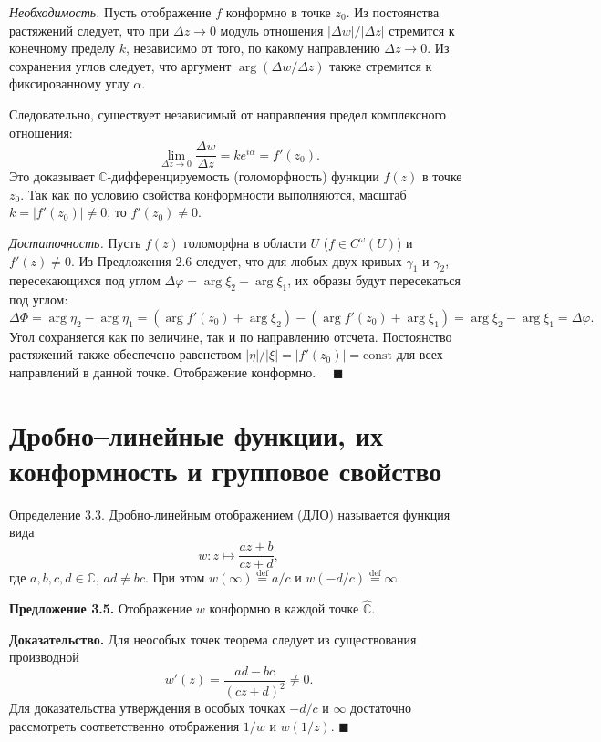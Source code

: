 \documentclass[12pt, a4paper]{article}
\theoremstyle{definition}
\theoremstyle{remark}
\begin{document}
\textit{Необходимость.} Пусть отображение $f$ конформно в точке $z_0$. Из постоянства растяжений следует, что при $\Delta z \to 0$ модуль отношения $|\Delta w| / |\Delta z|$ стремится к конечному пределу $k$, независимо от того, по какому направлению $\Delta z \to 0$. Из сохранения углов следует, что аргумент $\arg(\Delta w / \Delta z)$ также стремится к фиксированному углу $\alpha$. 

Следовательно, существует независимый от направления предел комплексного отношения:
\[
\lim_{\Delta z \to 0} \frac{\Delta w}{\Delta z} = k e^{i\alpha} = f'(z_0).
\]
Это доказывает $\mathbb{C}$-дифференцируемость (голоморфность) функции $f(z)$ в точке $z_0$. Так как по условию свойства конформности выполняются, масштаб $k = |f'(z_0)| \neq 0$, то $f'(z_0) \neq 0$.

\textit{Достаточность.} Пусть $f(z)$ голоморфна в области $U$ ($f \in C^{\omega}(U)$) и $f'(z) \neq 0$. Из Предложения 2.6 следует, что для любых двух кривых $\gamma_1$ и $\gamma_2$, пересекающихся под углом $\Delta \varphi = \arg \xi_2 - \arg \xi_1$, их образы будут пересекаться под углом:
\[
\Delta \Phi = \arg \eta_2 - \arg \eta_1 = (\arg f'(z_0) + \arg \xi_2) - (\arg f'(z_0) + \arg \xi_1) = \arg \xi_2 - \arg \xi_1 = \Delta \varphi.
\]
Угол сохраняется как по величине, так и по направлению отсчета. Постоянство растяжений также обеспечено равенством $|\eta|/|\xi| = |f'(z_0)| = \text{const}$ для всех направлений в данной точке. Отображение конформно. $\quad \blacksquare$

\newpage
\section{Дробно–линейные функции, их конформность и групповое свойство}
Определение 3.3. Дробно-линейным отображением (ДЛО) называется функция вида
\begin{equation}
	w : z \mapsto \frac{az + b}{cz + d},
\end{equation}
где $a, b, c, d \in \mathbb{C}$, $ad \neq bc$. При этом $w(\infty) \stackrel{\text{def}}{=} a/c$ и $w(-d/c) \stackrel{\text{def}}{=} \infty$.

\textbf{Предложение 3.5.} Отображение $w$ конформно в каждой точке $\hat{\mathbb{C}}$.

\textbf{Доказательство.} Для неособых точек теорема следует из существования производной
\[
w'(z) = \frac{ad - bc}{(cz + d)^2} \neq 0.
\]
Для доказательства утверждения в особых точках $-d/c$ и $\infty$ достаточно рассмотреть соответственно отображения $1/w$ и $w(1/z)$. $\blacksquare$
\end{document}
